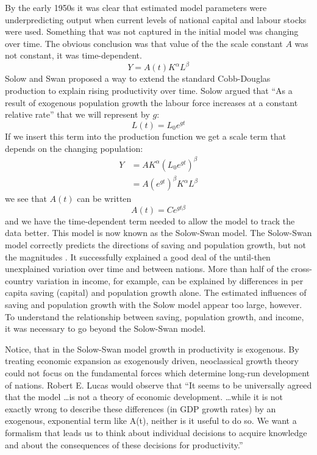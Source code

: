 By the early 1950s it was clear that estimated model parameters were underpredicting  output when  current levels of  national capital and labour stocks were used.   Something that was not captured in the initial model was changing over time. The obvious conclusion was that value of the the scale constant $A$  was not constant, it was time-dependent. 
 \[Y=A(t)K^\alpha L^\beta\]
Solow and Swan proposed a way to extend the standard \gls{Cobb-Douglas} production to explain rising productivity over time. 
Solow  argued that ``As a result of exogenous population growth the labour force increases at a constant relative rate'' that we will represent by  $g$:
  \[L(t)= L_0e^{gt}\] 
If we insert this term into the production function we get a scale term that depends on the changing population: 
\begin{eqnarray}
Y &= AK^\alpha (L_0e^{gt})^\beta\nonumber\\
  &= A(e^{gt})^{\beta}K^\alpha L^\beta
\label{eqn-solow-swan3}
\end{eqnarray}
we see that $A(t)$ can be written
 \[A(t)=Ce^{gt\beta}\]
and we have the time-dependent term needed to  allow the model to track the data better. This model is now known as the \gls{Solow-Swan model}. 
The \gls{Solow-Swan model} correctly predicts the directions of saving and population growth, but not the magnitudes \cite{mankiwContributionEmpiricsEconomic1992}. It successfully explained a good deal of the until-then unexplained variation over time and between nations. More than half  of the cross-country variation in income, for example,  can be explained by differences in per capita saving (capital) and population growth alone. The estimated influences of saving and population growth with the Solow model appear too large, however. To understand the relationship between saving, population growth, and income, it was necessary to go beyond the  Solow-Swan model.

Notice, that in the Solow-Swan model growth in productivity is exogenous.
By treating economic expansion  as exogenously driven, neoclassical growth theory could not focus on the fundamental forces which determine long-run development of nations.   Robert E. Lucas \cite{lucasMechanicsEconomicDevelopment1988} would observe that ``It seems to be universally agreed that the model \dots is not a theory of economic development.   \dots while it is not exactly wrong to describe these differences (in GDP  growth rates) by an exogenous, exponential term like A(t), neither is it useful to do so. We want a formalism that leads us to think about individual decisions to acquire knowledge and about the consequences of these decisions for productivity.'' 


